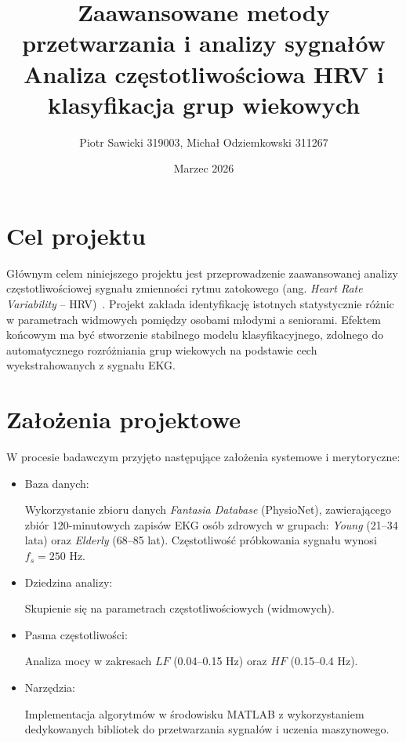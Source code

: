 \documentclass[a4paper,12pt]{article}
\title{
\Large Zaawansowane metody przetwarzania i analizy sygnałów \\[6pt]
\textbf{Analiza częstotliwościowa HRV i klasyfikacja grup wiekowych }
}
\author{Piotr Sawicki 319003, Michał Odziemkowski 311267}
\date{Marzec 2026}
\begin{document}
\maketitle


\section{Cel projektu}
Głównym celem niniejszego projektu jest przeprowadzenie zaawansowanej analizy częstotliwościowej sygnału zmienności rytmu zatokowego (ang. \textit{Heart Rate Variability} – HRV)~. Projekt zakłada identyfikację istotnych statystycznie różnic w parametrach widmowych pomiędzy osobami młodymi a seniorami. Efektem końcowym ma być stworzenie stabilnego modelu klasyfikacyjnego, zdolnego do automatycznego rozróżniania grup wiekowych na podstawie cech wyekstrahowanych z sygnału EKG.

\section{Założenia projektowe}
W procesie badawczym przyjęto następujące założenia systemowe i merytoryczne:
\begin{itemize}
    \item Baza danych:
    
    Wykorzystanie zbioru danych \textit{Fantasia Database} (PhysioNet), zawierającego zbiór 120-minutowych zapisów EKG osób zdrowych w grupach: \textit{Young} (21–34 lata) oraz \textit{Elderly} (68–85 lat). Częstotliwość próbkowania sygnału wynosi $f_s = 250$ Hz.
    \item Dziedzina analizy:
    
    Skupienie się na parametrach częstotliwościowych (widmowych).
    \item Pasma częstotliwości:
    
    Analiza mocy w zakresach $LF$ (0.04--0.15 Hz) oraz $HF$ (0.15--0.4 Hz).
    \item Narzędzia:
    
    Implementacja algorytmów w środowisku MATLAB z wykorzystaniem dedykowanych bibliotek do przetwarzania sygnałów i uczenia maszynowego.
\end{itemize}

\newpage
\end{document}
